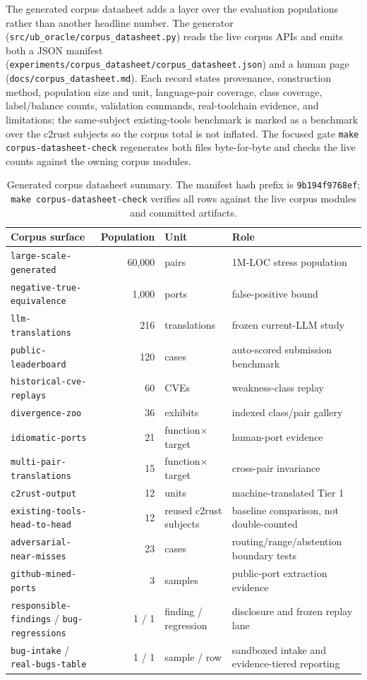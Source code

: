 \documentclass[10pt,a4paper]{article}
\begin{document}
The generated corpus datasheet adds a layer over the evaluation populations rather
than another headline number.  The generator
(\texttt{src/ub\_oracle/corpus\_datasheet.py}) reads the live corpus APIs and
emits both a JSON manifest
(\texttt{experiments/corpus\_datasheet/corpus\_datasheet.json}) and a human page
(\texttt{docs/corpus\_datasheet.md}).  Each record states provenance,
construction method, population size and unit, language-pair coverage, class
coverage, label/balance counts, validation commands, real-toolchain evidence, and
limitations; the same-subject existing-tools benchmark is marked as a benchmark
over the c2rust subjects so the corpus total is not inflated.  The focused gate
\texttt{make corpus-datasheet-check} regenerates both files byte-for-byte and
checks the live counts against the owning corpus modules.

\begin{table}[t]
\centering
\small
\caption{Generated corpus datasheet summary. The manifest hash prefix is
\texttt{9b194f9768ef}; \texttt{make corpus-datasheet-check} verifies all rows
against the live corpus modules and committed artifacts.}
\label{tab:corpus-datasheet}
\begin{tabularx}{\linewidth}{@{}lrlX@{}}
\toprule
Corpus surface & Population & Unit & Role \\
\midrule
\texttt{large-scale-generated} & 60{,}000 & pairs & 1M-LOC stress population \\
\texttt{negative-true-equivalence} & 1{,}000 & ports & false-positive bound \\
\texttt{llm-translations} & 216 & translations & frozen current-LLM study \\
\texttt{public-leaderboard} & 120 & cases & auto-scored submission benchmark \\
\texttt{historical-cve-replays} & 60 & CVEs & weakness-class replay \\
\texttt{divergence-zoo} & 36 & exhibits & indexed class/pair gallery \\
\texttt{idiomatic-ports} & 21 & function$\times$target & human-port evidence \\
\texttt{multi-pair-translations} & 15 & function$\times$target & cross-pair invariance \\
\texttt{c2rust-output} & 12 & units & machine-translated Tier 1 \\
\texttt{existing-tools-head-to-head} & 12 & reused c2rust subjects & baseline comparison, not double-counted \\
\texttt{adversarial-near-misses} & 23 & cases & routing/range/abstention boundary tests \\
\texttt{github-mined-ports} & 3 & samples & public-port extraction evidence \\
\texttt{responsible-findings} / \texttt{bug-regressions} & 1 / 1 & finding / regression & disclosure and frozen replay lane \\
\texttt{bug-intake} / \texttt{real-bugs-table} & 1 / 1 & sample / row & sandboxed intake and evidence-tiered reporting \\
\bottomrule
\end{tabularx}
\end{table}
\end{document}
